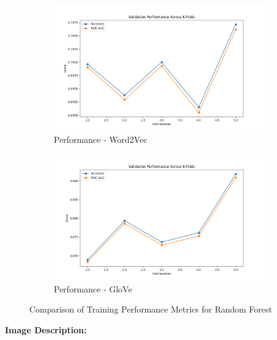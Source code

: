 \begin{figure}[H]
    \begin{subfigure}[b]{0.48\textwidth}
        \includegraphics[width=\textwidth]{img/report_info/img/1.4.RF/best_random_forest_word2vec.png}
        \caption{Performance - Word2Vec}
        \label{fig:rf-word2vec}
    \end{subfigure}
    \begin{subfigure}[b]{0.48\textwidth}
        \includegraphics[width=\textwidth]{img/report_info/img/1.4.RF/best_random_forest_glove.png}
        \caption{Performance - GloVe}
        \label{fig:rf-glove}
    \end{subfigure}
    
    \caption{Comparison of Training Performance Metrics for Random Forest}
    \label{fig:rf-performance-group}
\end{figure}

\textbf{Image Description:}


